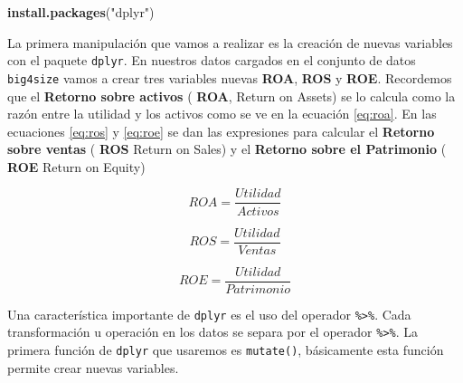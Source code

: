 \documentclass[]{book}
\newenvironment{Shaded}{\begin{snugshade}}{\end{snugshade}}
\newcommand{\DataTypeTok}[1]{\textcolor[rgb]{0.13,0.29,0.53}{#1}}
\newcommand{\KeywordTok}[1]{\textcolor[rgb]{0.13,0.29,0.53}{\textbf{#1}}}
\newcommand{\NormalTok}[1]{#1}
\newcommand{\OperatorTok}[1]{\textcolor[rgb]{0.81,0.36,0.00}{\textbf{#1}}}
\newcommand{\StringTok}[1]{\textcolor[rgb]{0.31,0.60,0.02}{#1}}
\begin{document}
\begin{Shaded}
\begin{Highlighting}[]
\KeywordTok{install.packages}\NormalTok{(}\StringTok{"dplyr"}\NormalTok{)}
\end{Highlighting}
\end{Shaded}

La primera manipulación que vamos a realizar es la creación de nuevas variables con el paquete \texttt{dplyr}. En nuestros datos cargados en el conjunto de datos \texttt{big4size} vamos a crear tres variables nuevas \textbf{ROA}, \textbf{ROS} y \textbf{ROE}. Recordemos que el \textbf{Retorno sobre activos} ( \textbf{ROA}, Return on Assets) se lo calcula como la razón entre la utilidad y los activos como se ve en la ecuación \eqref{eq:roa}. En las ecuaciones \eqref{eq:ros} y \eqref{eq:roe} se dan las expresiones para calcular el \textbf{Retorno sobre ventas} ( \textbf{ROS} Return on Sales) y el \textbf{Retorno sobre el Patrimonio} ( \textbf{ROE} Return on Equity)

\begin{equation} 
  ROA = \dfrac{Utilidad}{Activos}
  \label{eq:roa}
\end{equation}

\begin{equation} 
  ROS = \dfrac{Utilidad}{Ventas}
  \label{eq:ros}
\end{equation}

\begin{equation} 
  ROE = \dfrac{Utilidad}{Patrimonio}
  \label{eq:roe}
\end{equation}

Una característica importante de \texttt{dplyr} es el uso del operador \texttt{\%\textgreater{}\%}. Cada transformación u operación en los datos se separa por el operador \texttt{\%\textgreater{}\%}. La primera función de \texttt{dplyr} que usaremos es \texttt{mutate()}, básicamente esta función permite crear nuevas variables.

\begin{Shaded}
\end{Shaded}
\end{document}
